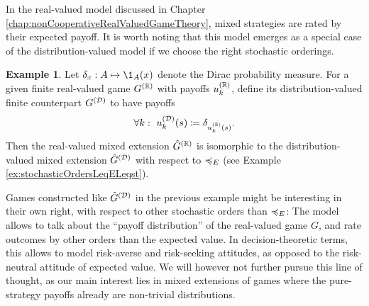 \documentclass[a4paper,DIV=11,abstracton,twoside=semi]{scrreprt}
\theoremstyle{definition}
\newtheorem{ex}[thm]{Example} %
\begin{document}
    In the real-valued model discussed in Chapter \ref{chap:nonCooperativeRealValuedGameTheory}, mixed strategies are rated by their expected payoff. It is worth noting that this model emerges as a special case of the distribution-valued model if we choose the right stochastic orderings.
    \begin{ex}
        Let $\delta_x: A \mapsto \1_A(x)$ denote the Dirac probability measure.
        For a given finite real-valued game $G^{(\mathbb{R})}$ with payoffs $u_k^{(\mathbb{R})}$, define its distribution-valued finite counterpart $G^{(\mathcal{D})}$ to have payoffs
        \begin{gather*}
            \forall k: ~u_k^{(\mathcal{D})}(s) \coloneqq \delta_{u_k^{(\mathbb{R})}(s)}.
        \end{gather*}
        Then the real-valued mixed extension $\hat{G}^{(\mathbb{R})}$ is isomorphic to the distribution-valued mixed extension $\hat{G}^{(\mathcal{D})}$ with respect to $\preccurlyeq_E$ (see Example \ref{ex:stochasticOrdersLeqELeqst}).
    \end{ex}
    Games constructed like $\hat{G}^{(\mathcal{D})}$ in the previous example might be interesting in their own right, with respect to other stochastic orders than $\preccurlyeq_E$:
    The model allows to talk about the “payoff distribution” of the real-valued game $G$, and rate outcomes by other orders than the expected value. 
    In decision-theoretic terms, this allows to model risk-averse and risk-seeking attitudes, as opposed to the risk-neutral attitude of expected value. We will however not further pursue this line of thought, as our main interest lies in mixed extensions of games where the pure-strategy payoffs already are non-trivial distributions.
    
\end{document}
